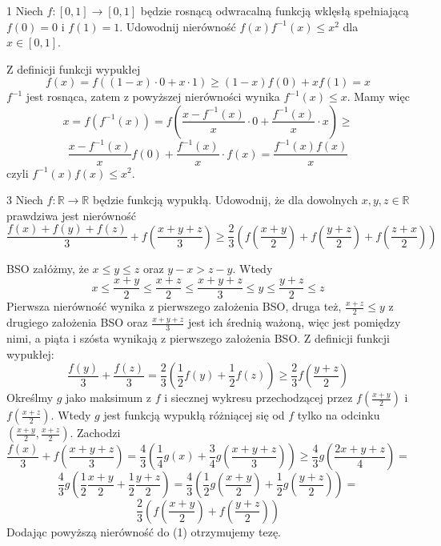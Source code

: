 \documentclass{../note}
\begin{document}
\begin{zadanie}{1}
Niech $f:[0,1]\rightarrow[0,1]$ będzie rosnącą odwracalną funkcją wklęsłą spełniającą $f(0)=0$ i $f(1)=1$. Udowodnij nierówność $f(x)f^{-1}(x)\le x^{2}$ dla $x\in[0,1]$.
\end{zadanie}
\begin{rozwiazanie}
Z definicji funkcji wypukłej
\[f(x) = f((1-x)\cdot 0 + x\cdot 1) \geq (1-x)f(0) + xf(1) = x\]
$f^{-1}$ jest rosnąca, zatem z powyższej nierówności wynika $f^{-1}(x) \leq x$. Mamy więc
\[x = f(f^{-1}(x)) = f\left(\frac{x-f^{-1}(x)}{x} \cdot 0 + \frac{f^{-1}(x)}{x}\cdot x\right) \geq\]\[ \frac{x-f^{-1}(x)}{x}f(0) + \frac{f^{-1}(x)}{x}\cdot f(x) = \frac{f^{-1}(x)f(x)}{x}\]
czyli $f^{-1}(x)f(x) \leq x^2$.
\end{rozwiazanie}

\begin{zadanie}{3}
Niech $f:\mathbb{R}\rightarrow\mathbb{R}$ będzie funkcją wypukłą. Udowodnij, że dla dowolnych $x,y,z\in\mathbb{R}$ prawdziwa jest nierówność
$$
\frac{f(x)+f(y)+f(z)}{3}+f\left(\frac{x+y+z}{3}\right)\ge\frac{2}{3}\left(f\left(\frac{x+y}{2}\right)+f\left(\frac{y+z}{2}\right)+f\left(\frac{z+x}{2}\right)\right)
$$
\end{zadanie}
\begin{rozwiazanie}
BSO załóżmy, że $x \leq y \leq z$ oraz $y - x > z - y$. Wtedy
\[x \leq \frac{x+y}{2} \leq \frac{x + z}{2} \leq \frac{x + y + z}{3} \leq y \leq \frac{y+z}{2} \leq z\]
Pierwsza nierówność wynika z pierwszego założenia BSO, druga też, $\frac{x + z}{2} \leq y$ z drugiego założenia BSO oraz $\frac{x + y + z}{3}$ jest ich średnią ważoną, więc jest pomiędzy nimi, a piąta i szósta wynikają z pierwszego założenia BSO. Z definicji funkcji wypukłej:
\begin{equation}
\frac{f(y)}{3} + \frac{f(z)}{3} = \frac23\left(\frac12f(y) + \frac12f(z)\right) \geq \frac23f\left(\frac{y+z}{2}\right)
\end{equation}
Określmy $g$ jako maksimum z $f$ i siecznej wykresu przechodzącej przez $f\left(\frac{x+y}{2}\right)$ i $f\left(\frac{x+z}{2}\right)$. Wtedy $g$ jest funkcją wypukłą różniącej się od $f$ tylko na odcinku $\left(\frac{x+y}{2}, \frac{x+z}{2}\right)$. Zachodzi
\[\frac{f(x)}{3} + f\left(\frac{x + y + z}{3}\right) = \frac{4}{3}\left(\frac14g(x) +  \frac34g\left(\frac{x + y + z}{3}\right)\right) \geq \frac{4}{3}g\left(\frac{2x+y+z}{4}\right) = \]
\[\frac{4}{3}g\left(\frac12 \frac{x+y}{2} + \frac12\frac{y+z}{2}\right) = \frac43\left(\frac12 g\left(\frac{x+y}{2}\right) + \frac12 g\left(\frac{y+z}{2}\right)\right) =\]\[ \frac23\left(f\left(\frac{x+y}{2}\right) + f\left(\frac{y+z}{2}\right)\right)\]
Dodając powyższą nierówność do (1) otrzymujemy tezę.
\end{rozwiazanie}
\end{document}
